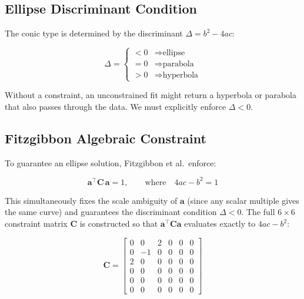 \documentclass{article}
\begin{document}
	\subsection{Ellipse Discriminant Condition}
	
	The conic type is determined by the discriminant $\Delta = b^2 - 4ac$:
	
	\begin{equation}
		\Delta =
		\begin{cases}
			< 0 & \Rightarrow \text{ellipse} \\
			= 0 & \Rightarrow \text{parabola} \\
			> 0 & \Rightarrow \text{hyperbola}
		\end{cases}
	\end{equation}
	
	Without a constraint, an unconstrained fit might return
	a hyperbola or parabola that also passes through the data.
	We must explicitly enforce $\Delta < 0$.
	
	\subsection{Fitzgibbon Algebraic Constraint}
	
	To guarantee an ellipse solution, Fitzgibbon et al.\ enforce:
	
	\begin{equation}
		\mathbf{a}^\top \mathbf{C}\, \mathbf{a} = 1,
		\qquad \text{where} \quad
		4ac - b^2 = 1
		\label{eq:constraint}
	\end{equation}
	
	This simultaneously fixes the scale ambiguity of $\mathbf{a}$
	(since any scalar multiple gives the same curve) and guarantees
	the discriminant condition $\Delta < 0$.
	The full $6 \times 6$ constraint matrix $\mathbf{C}$ is
	constructed so that $\mathbf{a}^\top\mathbf{C}\mathbf{a}$
	evaluates exactly to $4ac - b^2$:
	
	\begin{equation}
		\mathbf{C} =
		\begin{bmatrix}
			0 & 0 & 2 & 0 & 0 & 0 \\
			0 &-1 & 0 & 0 & 0 & 0 \\
			2 & 0 & 0 & 0 & 0 & 0 \\
			0 & 0 & 0 & 0 & 0 & 0 \\
			0 & 0 & 0 & 0 & 0 & 0 \\
			0 & 0 & 0 & 0 & 0 & 0
		\end{bmatrix}
	\end{equation}
	
\end{document}
